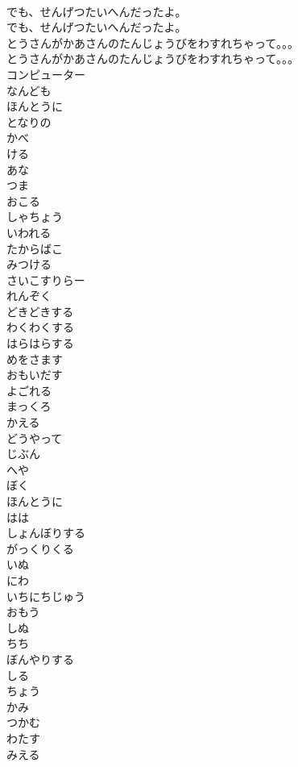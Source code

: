 \documentclass[8pt]{extreport}
\begin{document}
\begin{CJK}{UTF8}{min}
\\	でも、せんげつたいへんだったよ。
\\	でも、せんげつたいへんだったよ。
\\	とうさんがかあさんのたんじょうびをわすれちゃって。。。
\\	とうさんがかあさんのたんじょうびをわすれちゃって。。。
\\	コンピューター
\\	なんども
\\	ほんとうに
\\	となりの
\\	かべ
\\	ける
\\	あな
\\	つま
\\	おこる
\\	しゃちょう
\\	いわれる
\\	たからばこ
\\	みつける
\\	さいこすりらー
\\	れんぞく
\\	どきどきする
\\	わくわくする
\\	はらはらする
\\	めをさます
\\	おもいだす
\\	よごれる
\\	まっくろ
\\	かえる
\\	どうやって
\\	じぶん
\\	へや
\\	ぼく
\\	ほんとうに
\\	はは
\\	しょんぼりする
\\	がっくりくる
\\	いぬ
\\	にわ
\\	いちにちじゅう
\\	おもう
\\	しぬ
\\	ちち
\\	ぼんやりする
\\	しる
\\	ちょう
\\	かみ
\\	つかむ
\\	わたす
\\	みえる

\end{CJK}
\end{document}
